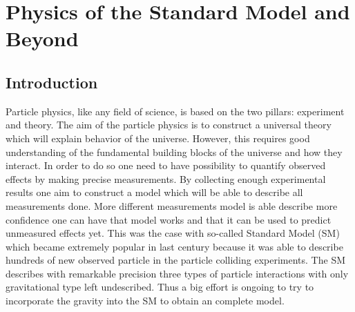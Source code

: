\chapter{Physics of the Standard Model and Beyond}
\label{chap:Theory}



\section{Introduction}


Particle physics, like any field of science, is based on the two pillars: experiment and theory.
The aim of the particle physics is to construct a universal theory which will explain behavior of the universe.
However, this requires good understanding of the fundamental building blocks of the universe and how they interact.
In order to do so one need to have possibility to quantify observed effects by making precise measurements.
By collecting enough experimental results one aim to construct a model which will be able to describe all measurements done.
More different measurements model is able describe more confidence one can have that model works and that it can be used to predict 
unmeasured effects yet. This was the case with so-called Standard Model (SM) which became extremely popular in last century because
it was able to describe hundreds of new observed particle in the particle colliding experiments.
The SM describes with remarkable precision three types of particle interactions with only gravitational type left undescribed.
Thus a big effort is ongoing to try to incorporate the gravity into the SM to obtain an complete model.


